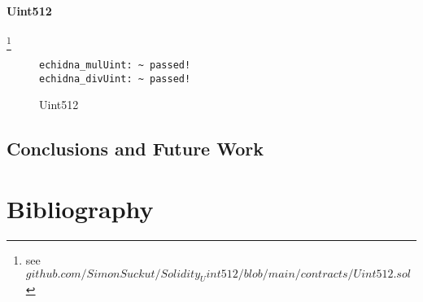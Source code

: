 \documentclass[runningheads]{llncs}
\begin{document}
\subsubsection{Uint512}
\footnote{see $github.com/SimonSuckut/Solidity_Uint512/blob/main/contracts/Uint512.sol$}


\begin{figure}
    \centering
    \caption{Uint512 }
    \label{fig:Echidna Uint512 Tests}
\begin{lstlisting}
echidna_mulUint: ~ passed! 
echidna_divUint: ~ passed!
\end{lstlisting}
\end{figure}


\section{Conclusions and Future Work}

\newpage
%
%
%
% 
% 
%
\chapter{Bibliography}
\end{document}
